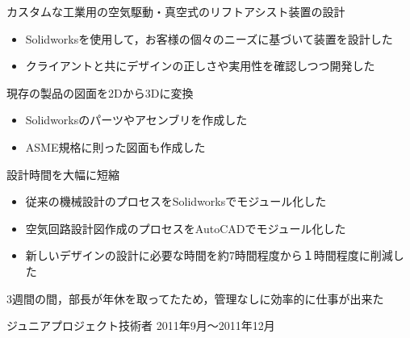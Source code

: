 \documentclass[10pt, a4paper]{article}
\begin{document}
\begin{outerlist}
  \begin{innerlist}
  \item カスタムな工業用の空気駆動・真空式のリフトアシスト装置の設計
  \begin{itemize}
    \item Solidworksを使用して，お客様の個々のニーズに基づいて装置を設計した
    \item クライアントと共にデザインの正しさや実用性を確認しつつ開発した
  \end{itemize}
  \item 現存の製品の図面を2Dから3Dに変換
  \begin{itemize}
    \item Solidworksのパーツやアセンブリを作成した
    \item ASME規格に則った図面も作成した
  \end{itemize}
  \item 設計時間を大幅に短縮
  \begin{itemize}
    \item 従来の機械設計のプロセスをSolidworksでモジュール化した
    \item 空気回路設計図作成のプロセスをAutoCADでモジュール化した
    \item 新しいデザインの設計に必要な時間を約7時間程度から１時間程度に削減した
  \end{itemize}
  \item 3週間の間，部長が年休を取ってたため，管理なしに効率的に仕事が出来た
  \end{innerlist}

\item[\href{http://www.kqbikes.com/}{\parbox[t]{3cm}{\raggedleft Kevin Quan Studios有限会社}}]{ジュニアプロジェクト技術者} \hfill {2011年9月〜2011年12月}


\end{outerlist}
\end{document}
